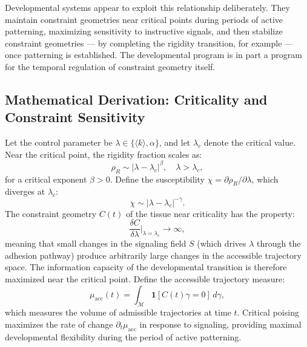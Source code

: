 \documentclass[12pt, a4paper, openany]{book}
\theoremstyle{definition}
\theoremstyle{remark}
\begin{document}
Developmental systems appear to exploit this relationship deliberately. They maintain constraint geometries near critical points during periods of active patterning, maximizing sensitivity to instructive signals, and then stabilize constraint geometries — by completing the rigidity transition, for example — once patterning is established. The developmental program is in part a program for the temporal regulation of constraint geometry itself.

\subsection*{Mathematical Derivation: Criticality and Constraint Sensitivity}

Let the control parameter be $\lambda \in \{\langle k \rangle, \alpha\}$, and let $\lambda_c$ denote the critical value. Near the critical point, the rigidity fraction scales as:
\begin{equation}
\rho_R \sim |\lambda - \lambda_c|^\beta, \quad \lambda > \lambda_c,
\end{equation}
for a critical exponent $\beta > 0$. Define the susceptibility $\chi = \partial \rho_R / \partial \lambda$, which diverges at $\lambda_c$:
\begin{equation}
\chi \sim |\lambda - \lambda_c|^{-\gamma}.
\end{equation}
The constraint geometry $C(t)$ of the tissue near criticality has the property:
\begin{equation}
\frac{\delta C}{\delta \lambda} \Big|_{\lambda = \lambda_c} \to \infty,
\end{equation}
meaning that small changes in the signaling field $S$ (which drives $\lambda$ through the adhesion pathway) produce arbitrarily large changes in the accessible trajectory space. The information capacity of the developmental transition is therefore maximized near the critical point. Define the accessible trajectory measure:
\begin{equation}
\mu_{\text{acc}}(t) = \int_{\mathcal{M}} \mathbf{1}[C(t)\gamma = 0]\,d\gamma,
\end{equation}
which measures the volume of admissible trajectories at time $t$. Critical poising maximizes the rate of change $\partial_t \mu_{\text{acc}}$ in response to signaling, providing maximal developmental flexibility during the period of active patterning.
\end{document}
